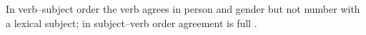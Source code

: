 
In verb--subject order the verb agrees in person and gender but not number with a lexical subject; in subject--verb order agreement is full \citep{benmamoun2000}.
